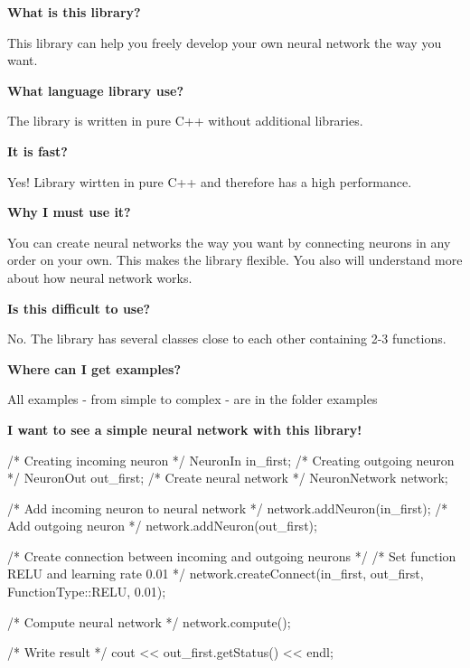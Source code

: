 {\bfseries{What is this library?}}

This library can help you freely develop your own neural network the way you want.

{\bfseries{What language library use?}}

The library is written in pure C++ without additional libraries.

{\bfseries{It is fast?}}

Yes! Library wirtten in pure C++ and therefore has a high performance.

{\bfseries{Why I must use it?}}

You can create neural networks the way you want by connecting neurons in any order on your own. This makes the library flexible. You also will understand more about how neural network works.

{\bfseries{Is this difficult to use?}}

No. The library has several classes close to each other containing 2-\/3 functions.

{\bfseries{Where can I get examples?}}

All examples -\/ from simple to complex -\/ are in the folder examples

{\bfseries{I want to see a simple neural network with this library!}} \begin{DoxyVerb}/* Creating incoming neuron */
NeuronIn in_first; 
/* Creating outgoing neuron */
NeuronOut out_first;
/* Create neural network */
NeuronNetwork network;

/* Add incoming neuron to neural network */
network.addNeuron(in_first);
/* Add outgoing neuron */
network.addNeuron(out_first);

/* Create connection between incoming and outgoing neurons */
/* Set function RELU and learning rate 0.01 */
network.createConnect(in_first, out_first, FunctionType::RELU, 0.01);

/* Compute neural network */
network.compute(); 

/* Write result */
cout << out_first.getStatus() << endl;
\end{DoxyVerb}
 